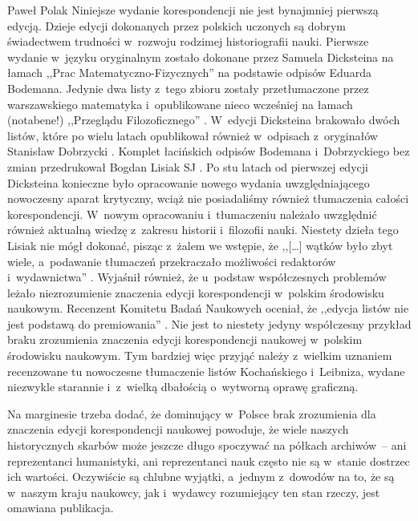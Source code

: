 \begin{recplenv}{Paweł Polak}
Niniejsze wydanie korespondencji nie jest bynajmniej pierwszą edycją. Dzieje edycji dokonanych przez polskich uczonych
są dobrym świadectwem trudności w~rozwoju rodzimej historiografii nauki. Pierwsze wydanie w~języku oryginalnym zostało
dokonane przez Samuela Dicksteina na łamach ,,Prac Matematyczno-Fizycznych''
\parencite{dickstein_korespondencya_1901,dickstein_korespondencya_1902}
na podstawie odpisów Eduarda Bodemana. Jedynie dwa listy z~tego zbioru zostały przetłumaczone przez
warszawskiego matematyka i~opublikowane nieco wcześniej na łamach (notabene!) ,,Przeglądu Filozoficznego''
\parencite{dickstein_wyjatek_1897}.
W~edycji Dicksteina brakowało dwóch listów, które po wielu latach
opublikował również w~odpisach z~oryginałów Stanisław Dobrzycki
\parencite*{dobrzycki_deux_1967}.
Komplet łacińskich
odpisów Bodemana i~Dobrzyckiego bez zmian przedrukował Bogdan Lisiak SJ
\parencite*{lisiak_korespondencja_2005}.
Po stu latach
od pierwszej edycji Dicksteina konieczne było opracowanie nowego wydania uwzględniającego nowoczesny aparat krytyczny,
wciąż nie posiadaliśmy również tłumaczenia całości korespondencji. W~nowym opracowaniu i~tłumaczeniu należało
uwzględnić również aktualną wiedzę z~zakresu historii i~filozofii nauki. Niestety dzieła tego Lisiak nie mógł dokonać, pisząc z~żalem
we wstępie, że ,,[…] wątków było zbyt wiele, a~podawanie tłumaczeń przekraczało możliwości redaktorów i~wydawnictwa''
\parencite[s.~9]{lisiak_korespondencja_2005}.
Wyjaśnił również, że u~podstaw współczesnych problemów
leżało niezrozumienie znaczenia edycji korespondencji w~polskim środowisku naukowym. Recenzent Komitetu Badań Naukowych
oceniał, że ,,edycja listów nie jest podstawą do premiowania''
\parencite[s.~10 {[przypis]}]{lisiak_korespondencja_2005}.
Nie jest to niestety jedyny współczesny przykład braku zrozumienia znaczenia edycji korespondencji naukowej w~polskim
środowisku naukowym. Tym bardziej więc przyjąć należy z~wielkim uznaniem recenzowane tu nowoczesne tłumaczenie listów
Kochańskiego i~Leibniza, wydane niezwykle starannie i~z~wielką dbałością o~wytworną oprawę graficzną.

Na marginesie trzeba dodać, że dominujący w~Polsce brak zrozumienia dla znaczenia edycji korespondencji naukowej
powoduje, że wiele naszych historycznych skarbów może jeszcze długo spoczywać na półkach archiwów~-- ani reprezentanci
humanistyki, ani reprezentanci nauk często nie są w~stanie dostrzec ich wartości. Oczywiście są chlubne wyjątki, a~jednym z~dowodów
na to, że są w~naszym kraju naukowcy, jak i~wydawcy rozumiejący ten stan rzeczy, jest omawiana
publikacja.


\end{recplenv}

